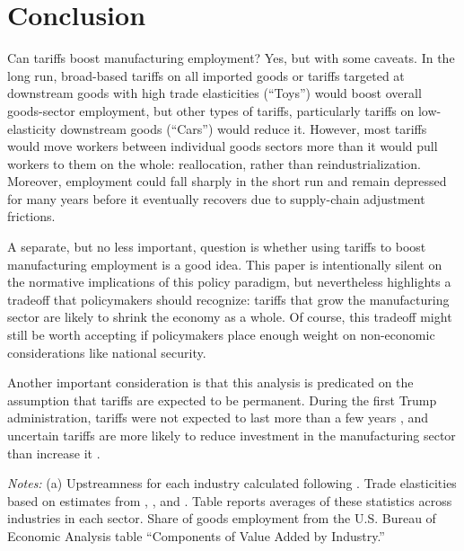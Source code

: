 \documentclass[12pt]{article}
\newenvironment{fignote}[1]
{\par \medskip \begin{minipage}{#1} \scriptsize}{\end{minipage}}
\begin{document}
\section{Conclusion}
Can tariffs boost manufacturing employment? Yes, but with some caveats. In the long run, broad-based tariffs on all imported goods or tariffs targeted at downstream goods with high trade elasticities (``Toys'') would boost overall goods-sector employment, but other types of tariffs, particularly tariffs on low-elasticity downstream goods (``Cars'') would reduce it. However, most tariffs would move workers between individual goods sectors more than it would pull workers to them on the whole: reallocation, rather than reindustrialization. Moreover, employment could fall sharply in the short run and remain depressed for many years before it eventually recovers due to supply-chain adjustment frictions.

A separate, but no less important, question is whether using tariffs to boost manufacturing employment is a good idea. This paper is intentionally silent on the normative implications of this policy paradigm, but nevertheless highlights a tradeoff that policymakers should recognize: tariffs that grow the manufacturing sector are likely to shrink the economy as a whole. Of course, this tradeoff might still be worth accepting if policymakers place enough weight on non-economic considerations like national security.

Another important consideration is that this analysis is predicated on the assumption that tariffs are expected to be permanent. During the first Trump administration, tariffs were not expected to last more than a few years \citep{ALESSANDRIA2025104066}, and uncertain tariffs are more likely to reduce investment in the manufacturing sector than increase it \citep{CALDARA202038}.

\newpage



\clearpage

\begin{table}[p]
\begin{center}
\caption{Calibration}
\label{tab:calibration}
\scriptsize
\renewcommand{\arraystretch}{1.2}

  \begin{fignote}{0.95\textwidth}
            \textit{Notes:} (a) Upstreamness for each industry calculated following \citet{acfh_2012}. Trade elasticities based on estimates from \citet{cp_2015}, \citet{KRS_2018}, and \citet{gsg-dsd}. Table reports averages of these statistics across industries in each sector. Share of goods employment from the U.S. Bureau of Economic Analysis table ``Components of Value Added by Industry.''
        \end{fignote}
\end{center}
\end{table}
\end{document}
